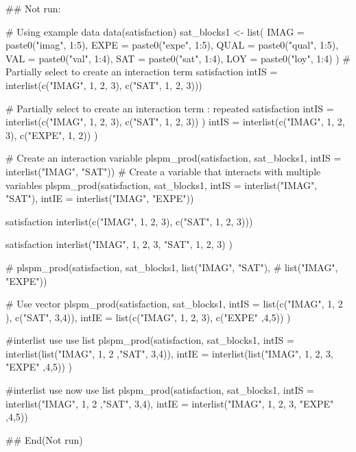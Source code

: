 \documentclass[a4paper]{book}
\begin{document}
\begin{Examples}
\begin{ExampleCode}

\#\# Not run: 

# Using example data
data(satisfaction)
sat_blocks1 <- list(
  IMAG = paste0("imag", 1:5),
  EXPE = paste0("expe", 1:5),
  QUAL = paste0("qual", 1:5),
  VAL = paste0("val", 1:4),
  SAT = paste0("sat", 1:4),
  LOY = paste0("loy", 1:4)
)
# Partially select to create an interaction term
satisfaction%
                           intIS = interlist(c("IMAG", 1, 2, 3), c("SAT", 1, 2, 3))) %

# Partially select to create an interaction term : repeated
satisfaction%
                           intIS = interlist(c("IMAG", 1, 2, 3), c("SAT", 1, 2, 3))
)%
                intIS = interlist(c("IMAG", 1, 2, 3), c("EXPE", 1, 2))
) %


# Create an interaction variable
plspm_prod(satisfaction, sat_blocks1, intIS = interlist("IMAG", "SAT"))    %
# Create a variable that interacts with multiple variables
plspm_prod(satisfaction, sat_blocks1, intIS = interlist("IMAG", "SAT"),
           intIE = interlist("IMAG", "EXPE"))    %

satisfaction%
                           interlist(c("IMAG", 1, 2, 3), c("SAT", 1, 2, 3))) %

satisfaction%
                           interlist("IMAG", 1, 2, 3, "SAT", 1, 2, 3) ) %

# plspm_prod(satisfaction, sat_blocks1, list("IMAG", "SAT"),
#                                        list("IMAG", "EXPE")) %


#  Use vector
plspm_prod(satisfaction, sat_blocks1,
           intIS = list(c("IMAG", 1, 2 ), c("SAT", 3,4)),
           intIE = list(c("IMAG", 1, 2, 3), c("EXPE" ,4,5))
) %

#interlist use use list
plspm_prod(satisfaction,
           sat_blocks1,
           intIS = interlist(list("IMAG", 1, 2 ,"SAT", 3,4)),
           intIE = interlist(list("IMAG", 1, 2, 3, "EXPE" ,4,5)) ) %


#interlist use now use list
plspm_prod(satisfaction,
           sat_blocks1,
           intIS = interlist("IMAG", 1, 2 ,"SAT", 3,4),
           intIE = interlist("IMAG", 1, 2, 3, "EXPE" ,4,5)) %

## End(Not run)



\end{ExampleCode}
\end{Examples}
\end{document}
